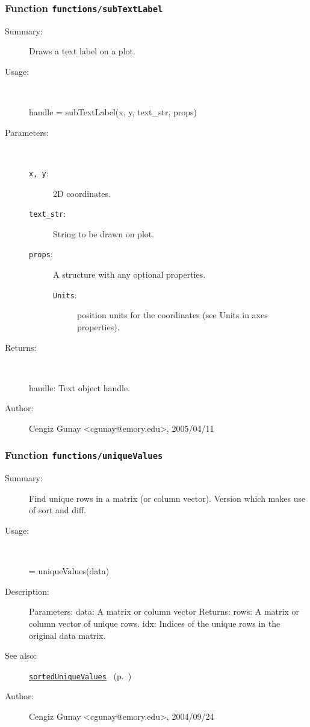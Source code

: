\subsubsection[Function \texttt{subTextLabel}]{Function \texttt{functions/subTextLabel}}%
%
\label{ref_functions__subTextLabel}%
\hypertarget{ref_functions__subTextLabel}{}%
\begin{description}
\item[Summary:]Draws a text label on a plot.
%
\item[Usage:]~%
\begin{lyxcode}%
handle = subTextLabel(x, y, text\_str, props)
%
\end{lyxcode}%
%
%
\item[Parameters:]~
\begin{description}%
\item[\texttt{x, y}:]
 2D coordinates.
\item[\texttt{text\_str}:]
 String to be drawn on plot.
\item[\texttt{props}:]
 A structure with any optional properties.
\begin{description}%
\item[\texttt{Units}:]
 position units for the coordinates (see Units in axes properties).
\end{description}%
\end{description}%
%
\item[Returns:]~

	handle: Text object handle.
%
%
%
\item[Author:]%
Cengiz Gunay <cgunay@emory.edu>, 2005/04/11%
\end{description}
\methodline%
\subsubsection[Function \texttt{uniqueValues}]{Function \texttt{functions/uniqueValues}}%
%
\label{ref_functions__uniqueValues}%
\hypertarget{ref_functions__uniqueValues}{}%
\begin{description}
\item[Summary:]Find unique rows in a matrix (or column vector). 
		Version which makes use of sort and diff.
%
\item[Usage:]~%
\begin{lyxcode}%
[rows, idx] = uniqueValues(data)
%
\end{lyxcode}%
%
\item[Description:]%
Parameters:
		data: A matrix or column vector
	Returns:
		rows: A matrix or column vector of unique rows.
		idx: Indices of the unique rows in the original data matrix.
%
%
%
\item[See also:]%
\hyperlink{ref_sortedUniqueValues}{\texttt{sortedUniqueValues}}%
\ (p.~\pageref{ref_sortedUniqueValues})%
%
%
\item[Author:]%
Cengiz Gunay <cgunay@emory.edu>, 2004/09/24%
\end{description}
\methodline%
